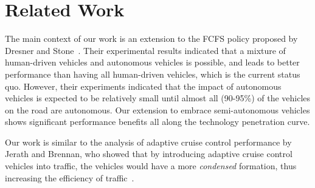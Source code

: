 \section{Related Work}
\label{sec:related}

The main context of our work is an extension to the FCFS policy
proposed by Dresner and Stone~\cite{bib:Dresner08Multiagent}. Their
experimental results indicated that a mixture of human-driven vehicles
and autonomous vehicles is possible, and leads to better performance
than having all human-driven vehicles, which is the current status
quo.  However, their experiments indicated that the impact of
autonomous vehicles is expected to be relatively small until almost all (90-95\%) of
the vehicles on the road are autonomous.  Our extension to embrace
semi-autonomous vehicles shows significant performance benefits all
along the technology penetration curve.

Our work is similar to the analysis of adaptive cruise control
performance by Jerath and Brennan, who showed that by introducing
adaptive cruise control vehicles into traffic, the vehicles would have
a more \textit{condensed} formation, thus increasing the efficiency
of traffic~\cite{bib:Jerath10adaptive}.



